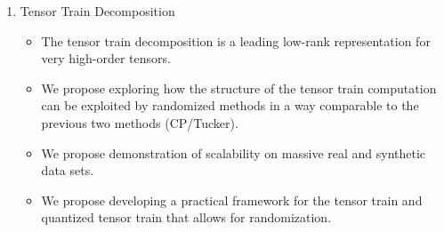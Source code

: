 \begin{enumerate}
\begin{itemize}
	\item We propose that the tensor structure uniquely allows for high-quality output because the efficiency of projections allows for significant \emph{oversampling} in very little time.
	\item We propose to demonstrate scalability on massive real and synthetic data sets on up to 1000 nodes.
	\item Deliverable: this method will be submitted for publication and included as part of TuckerMPI\footnote{\url{http://tensors.gitlab.io/TuckerMPI/}}.
\end{itemize}
\item Tensor Train Decomposition
\begin{itemize}
	\item The tensor train decomposition is a leading low-rank representation for very high-order tensors.
	\item We propose exploring how the structure of the tensor train computation can be exploited by randomized methods in a way comparable to the previous two methods (CP/Tucker).
	\item We propose demonstration of scalability on massive real and synthetic data sets.
	\item We propose developing a practical framework for the tensor train and quantized tensor train that allows for randomization. 
\end{itemize}
\end{enumerate}